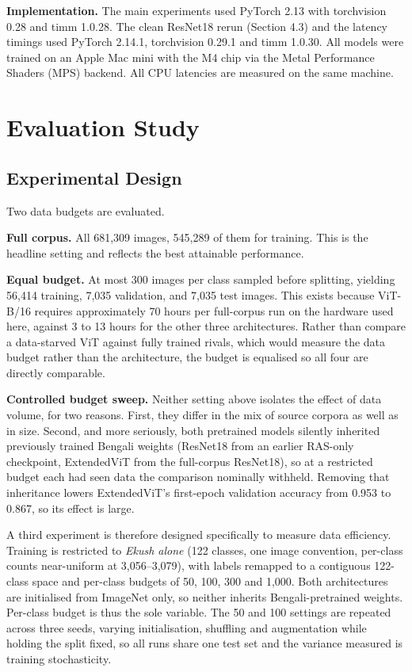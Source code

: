 \textbf{Implementation.} The main experiments used PyTorch \citep{paszke2019pytorch} 2.13 with torchvision 0.28 and timm
\citep{wightman2019timm} 1.0.28. The clean ResNet18 rerun (Section 4.3) and the latency timings used PyTorch 2.14.1, torchvision 0.29.1 and timm 1.0.30. All models were trained on an Apple Mac mini with the M4 chip via the Metal Performance Shaders (MPS) backend. All CPU latencies are measured on the same machine.


\hypertarget{evaluation-study}{%
\section{Evaluation Study}\label{evaluation-study}}

\hypertarget{experimental-design}{%
\subsection{Experimental Design}\label{experimental-design}}

Two data budgets are evaluated.

\textbf{Full corpus.} All 681,309 images, 545,289 of them for training.
This is the headline setting and reflects the best attainable
performance.

\textbf{Equal budget.} At most 300 images per class sampled before
splitting, yielding 56,414 training, 7,035 validation, and 7,035 test
images. This exists because ViT-B/16 requires approximately 70 hours per
full-corpus run on the hardware used here, against 3 to 13 hours for the other
three architectures. Rather than compare a data-starved ViT against
fully trained rivals, which would measure the data budget rather than
the architecture, the budget is equalised so all four are directly
comparable.

\textbf{Controlled budget sweep.} Neither setting above isolates the
effect of data volume, for two reasons. First, they differ in the mix of
source corpora as well as in size. Second, and more seriously, both pretrained models silently inherited previously trained Bengali
weights (ResNet18 from an earlier RAS-only checkpoint, ExtendedViT
from the full-corpus ResNet18), so at a restricted budget each had
seen data the comparison nominally withheld. Removing that inheritance
lowers ExtendedViT's first-epoch validation accuracy from 0.953 to 0.867,
so its effect is large.

A third experiment is therefore designed specifically to measure data efficiency. Training is restricted to \emph{Ekush alone} (122
classes, one image convention, per-class counts near-uniform at
3,056--3,079), with labels remapped to a contiguous 122-class space and
per-class budgets of 50, 100, 300 and 1,000. Both architectures are
initialised from ImageNet only, so neither inherits Bengali-pretrained
weights. Per-class budget is thus the sole variable. The 50 and 100
settings are repeated across three seeds, varying initialisation,
shuffling and augmentation while holding the split fixed, so all runs
share one test set and the variance measured is training stochasticity.

